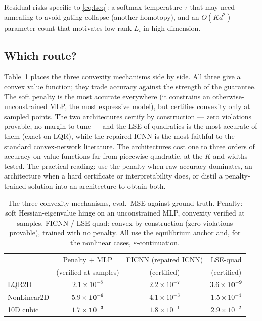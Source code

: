 \documentclass[11pt,a4paper]{article}
\begin{document}
Residual risks specific to \eqref{eq:lseq}: a softmax temperature $\tau$ that
may need annealing to avoid gating collapse (another homotopy), and an
$O(Kd^2)$ parameter count that motivates low-rank $L_i$ in high dimension.

\subsection{Which route?}\label{sec:which}

Table~\ref{tab:archcompare} places the three convexity mechanisms side by
side. All three give a convex value function; they trade accuracy against the
strength of the guarantee. The soft penalty is the most accurate everywhere
(it constrains an otherwise-unconstrained MLP, the most expressive model), but
certifies convexity only at sampled points. The two architectures certify by
construction --- zero violations provable, no margin to tune --- and the
LSE-of-quadratics is the most accurate of them (exact on LQR), while the
repaired ICNN is the most faithful to the standard convex-network literature.
The architectures cost one to three orders of accuracy on value functions far
from piecewise-quadratic, at the $K$ and widths tested. The practical reading:
use the penalty when raw accuracy dominates, an architecture when a hard
certificate or interpretability does, or distil a penalty-trained solution
into an architecture to obtain both.

\begin{table}[t]
\centering\small
\caption{The three convexity mechanisms, eval.\ MSE against ground truth.
Penalty: soft Hessian-eigenvalue hinge on an unconstrained MLP, convexity
verified at samples. FICNN / LSE-quad: convex by construction (zero violations
provable), trained with no penalty. All use the equilibrium anchor and, for
the nonlinear cases, $\varepsilon$-continuation.}
\label{tab:archcompare}
\begin{tabular}{lccc}
\toprule
 & Penalty + MLP & FICNN (repaired ICNN) & LSE-quad \\
 & (verified at samples) & (certified) & (certified) \\
\midrule
LQR2D       & $2.1\times10^{-8}$ & $2.2\times10^{-7}$ & $\mathbf{3.6\times10^{-9}}$ \\
NonLinear2D & $\mathbf{5.9\times10^{-6}}$ & $4.1\times10^{-3}$ & $1.5\times10^{-4}$ \\
10D cubic   & $\mathbf{1.7\times10^{-3}}$ & $1.8\times10^{-1}$ & $2.9\times10^{-2}$ \\
\bottomrule
\end{tabular}
\end{table}
\end{document}
